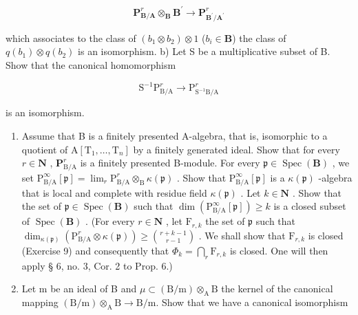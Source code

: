 \[
\mathbf {P} _ {\mathbf {B} / \mathbf {A}} ^ {r} \otimes_ {\mathbf {B}} \mathbf {B} ^ {\prime} \rightarrow \mathbf {P} _ {\mathbf {B} ^ {\prime} / \mathbf {A} ^ {\prime}} ^ {r}
\]

which associates to the class of \((b_{1} \otimes b_{2}) \otimes 1\) (\(b_{i} \in \mathbf{B}\)) the class of \(q(b_{1}) \otimes q(b_{2})\) is an isomorphism. b) Let S be a multiplicative subset of B. Show that the canonical homomorphism

\[
\mathrm{S} ^ {- 1} \mathrm{P} _ {\mathrm{B/A}} ^ {r} \rightarrow \mathrm{P} _ {\mathrm{S} ^ {- 1} \mathrm{B/A}} ^ {r}
\]

is an isomorphism.

\begin{enumerate}
\def\labelenumi{\alph{enumi})}
\setcounter{enumi}{2}
\item
  Assume that B is a finitely presented A-algebra, that is, isomorphic to a quotient of \(\mathrm{A}[\mathrm{T}_{1},\ldots,\mathrm{T}_{n}]\) by a finitely generated ideal. Show that for every \(r\in\mathbf{N}\) , \(\mathbf{P}_{\mathrm{B}/\mathrm{A}}^{r}\) is a finitely presented B-module. For every \(\mathfrak{p}\in\operatorname{Spec}(\mathbf{B})\) , we set \(\mathrm{P}_{\mathrm{B}/\mathrm{A}}^{\infty}[\mathfrak{p}]=\lim_{r}\mathrm{P}_{\mathrm{B}/\mathrm{A}}^{r}\otimes_{\mathrm{B}}\kappa(\mathfrak{p})\) . Show that \(\mathrm{P}_{\mathrm{B}/\mathrm{A}}^{\infty}[\mathfrak{p}]\) is a \(\kappa(\mathfrak{p})\) -algebra that is local and complete with residue field \(\kappa(\mathfrak{p})\) . Let \(k\in\mathbf{N}\) . Show that the set of \(\mathfrak{p}\in\operatorname{Spec}(\mathbf{B})\) such that \(\dim(\mathrm{P}_{\mathrm{B}/\mathrm{A}}^{\infty}[\mathfrak{p}])\geqslant k\) is a closed subset of \(\operatorname{Spec}(\mathbf{B})\) . (For every \(r\in\mathbf{N}\) , let \(\mathrm{F}_{r,k}\) the set of \(\mathfrak{p}\) such that \(\dim_{\kappa(\mathfrak{p})}(\mathrm{P}_{\mathrm{B}/\mathrm{A}}^{r}\otimes\kappa(\mathfrak{p}))\geqslant\binom{r+k-1}{r-1}\) . We shall show that \(\mathrm{F}_{r,k}\) is closed (Exercise 9) and consequently that \(\Phi_{k}=\bigcap_{r}\mathrm{F}_{r,k}\) is closed. One will then apply § 6, no. 3, Cor. 2 to Prop. 6.)
\item
  Let m be an ideal of B and \(\mu\subset(\mathrm{B/m})\otimes_{\mathrm{A}}\mathrm{B}\) the kernel of the canonical mapping \((\mathrm{B/m})\otimes_{\mathrm{A}}\mathrm{B}\to\mathrm{B/m}\). Show that we have a canonical isomorphism
\end{enumerate}

